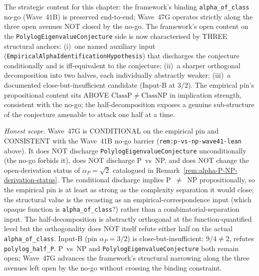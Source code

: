 \begin{remark}
\begin{itemize}
\end{itemize}
The strategic content for this chapter: the framework's binding \texttt{alpha\_of\_class} no-go (Wave~41B) is preserved end-to-end; Wave~47G operates strictly along the three open avenues NOT closed by the no-go. The framework's open content on the \texttt{PolylogEigenvalueConjecture} side is now characterised by THREE structural anchors: (i)~one named auxiliary input (\texttt{EmpiricalAlphaIdentificationHypothesis}) that discharges the conjecture conditionally and is iff-equivalent to the conjecture; (ii)~a sharper orthogonal decomposition into two halves, each individually abstractly weaker; (iii)~a documented close-but-insufficient candidate (Input-B at $3/2$). The empirical pin's propositional content sits ABOVE $\mathrm{ClassP} \neq \mathrm{ClassNP}$ in implication strength, consistent with the no-go; the half-decomposition exposes a genuine sub-structure of the conjecture amenable to attack one half at a time.

\emph{Honest scope.} Wave~47G is CONDITIONAL on the empirical pin and CONSISTENT with the Wave~41B no-go barrier (\texttt{rem:p-vs-np-wave41-lean} above). It does NOT discharge \texttt{PolylogEigenvalueConjecture} unconditionally (the no-go forbids it), does NOT discharge P~vs~NP, and does NOT change the open-derivation status of $\alpha_P = \sqrt{2}$ catalogued in Remark~\ref{rem:alpha-P-NP-derivation-status}. The conditional discharge implies P~$\neq$~NP propositionally, so the empirical pin is at least as strong as the complexity separation it would close; the structural value is the recasting as an empirical-correspondence input (which opaque function is \texttt{alpha\_of\_class}?) rather than a combinatorial-separation input. The half-decomposition is abstractly orthogonal at the function-quantified level but the orthogonality does NOT itself refute either half on the actual \texttt{alpha\_of\_class}. Input-B (pin $\alpha_P = 3/2$) is close-but-insufficient: $9/4 \neq 2$, refutes \texttt{polylog\_half\_P}. P~vs~NP and \texttt{PolylogEigenvalueConjecture} both remain open; Wave~47G advances the framework's structural narrowing along the three avenues left open by the no-go without crossing the binding constraint.
\end{remark}

